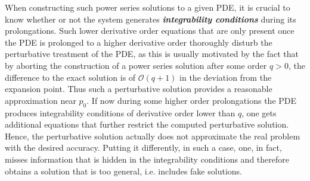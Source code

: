 \documentclass[%
preprint,
titlepage,
nofootinbib,
amsmath,amssymb,
showkeys,
aps,
prd,
floatfix,
]{revtex4-2}
\begin{document}
When constructing such power series solutions to a given PDE, it is crucial to know whether or not the system generates \textit{\textbf{integrability conditions}} during its prolongations. Such lower derivative order equations that are only present once the PDE is prolonged to a higher derivative order thoroughly disturb the perturbative treatment of the PDE, as this is usually motivated by the fact that by  aborting the construction of a power series solution
after some order $q>0$, the difference to the exact solution is of $\mathcal{O}(q+1)$ in the deviation from the expansion point. Thus such a perturbative solution provides a reasonable approximation near $p_0$. 
If now during some higher order prolongations the PDE produces integrability conditions of derivative order lower than $q$, one gets additional equations that further restrict the computed perturbative solution. 
Hence, the perturbative solution actually does not approximate the real problem with the desired accuracy. Putting it differently, in such a case, one, in fact, misses information that is hidden in the integrability conditions and therefore obtains a solution that is too general, i.e. includes fake solutions. 
\end{document}
